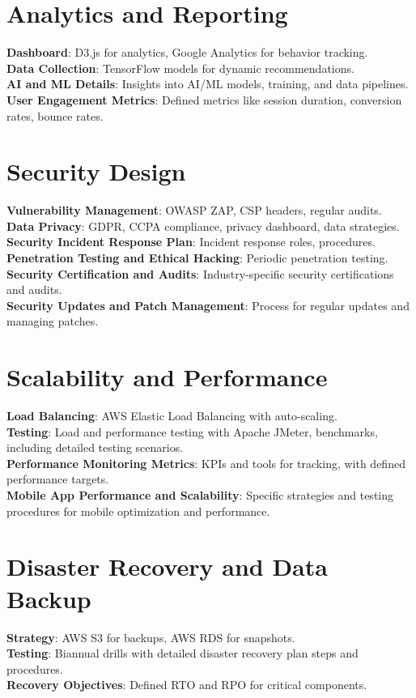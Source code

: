 \documentclass[a4paper,12pt]{article}
\begin{document}
	\section*{Analytics and Reporting}
	\textbf{Dashboard}: D3.js for analytics, Google Analytics for behavior tracking. \\
	\textbf{Data Collection}: TensorFlow models for dynamic recommendations. \\
	\textbf{AI and ML Details}: Insights into AI/ML models, training, and data pipelines. \\
	\textbf{User Engagement Metrics}: Defined metrics like session duration, conversion rates, bounce rates.
	
	\section*{Security Design}
	\textbf{Vulnerability Management}: OWASP ZAP, CSP headers, regular audits. \\
	\textbf{Data Privacy}: GDPR, CCPA compliance, privacy dashboard, data strategies. \\
	\textbf{Security Incident Response Plan}: Incident response roles, procedures. \\
	\textbf{Penetration Testing and Ethical Hacking}: Periodic penetration testing. \\
	\textbf{Security Certification and Audits}: Industry-specific security certifications and audits. \\
	\textbf{Security Updates and Patch Management}: Process for regular updates and managing patches.
	
	\section*{Scalability and Performance}
	\textbf{Load Balancing}: AWS Elastic Load Balancing with auto-scaling. \\
	\textbf{Testing}: Load and performance testing with Apache JMeter, benchmarks, including detailed testing scenarios. \\
	\textbf{Performance Monitoring Metrics}: KPIs and tools for tracking, with defined performance targets. \\
	\textbf{Mobile App Performance and Scalability}: Specific strategies and testing procedures for mobile optimization and performance.
	
	\section*{Disaster Recovery and Data Backup}
	\textbf{Strategy}: AWS S3 for backups, AWS RDS for snapshots. \\
	\textbf{Testing}: Biannual drills with detailed disaster recovery plan steps and procedures. \\
	\textbf{Recovery Objectives}: Defined RTO and RPO for critical components.
	
\end{document}
